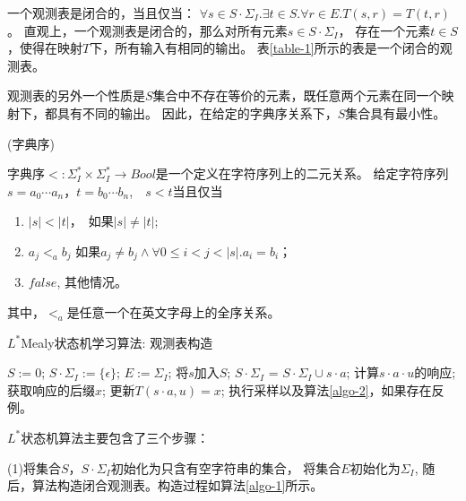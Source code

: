 一个观测表是闭合的，当且仅当：
$\forall s\in S\cdot \Sigma_{I}. \exists t\in S. \forall r\in E.
T(s, r) = T(t, r)$。
直观上，一个观测表是闭合的，那么对所有元素$s \in S\cdot \Sigma_{I}$，
存在一个元素$t\in S$，使得在映射$T$下，所有输入有相同的输出。
表\ref{table-1}所示的表是一个闭合的观测表。

观测表的另外一个性质是$S$集合中不存在等价的元素，既任意两个元素在同一个映射下，都具有不同的输出。
因此，在给定的字典序关系下，$S$集合具有最小性。

\begin{definition}{(字典序)}

	字典序$<: \Sigma_{I}^{*} \times \Sigma_{I}^{*} \rightarrow Bool$是一个定义在字符序列上的二元关系。
	给定字符序列$s = a_0\cdots a_n$，$t = b_0\cdots b_n$,　$s < t$当且仅当
	\begin{enumerate}
		\item $|s| < |t|$，　如果$|s| \neq |t|$;
		\item $a_{j} <_{a} b_{j}$
		如果$ a_{j} \neq b_{j} \wedge
		\forall 0 \leq i < j < |s|. a_{i} = b_{i}$；
		\item $false$, 其他情况。
	\end{enumerate}
	其中，$<_{a}$是任意一个在英文字母上的全序关系。
\end{definition}



\begin{algorithm}
\caption{$L^{*}$Mealy状态机学习算法: 观测表构造}
\label{algo-1}
\begin{algorithmic}
\STATE $S:=0$;
\STATE $S\cdot \Sigma_{I} := \{\epsilon\}$;
\STATE $E:=\Sigma_{I}$;
\STATE  将$s$加入$S$;
\STATE $S\cdot \Sigma_{I}$ = $S\cdot \Sigma_{I} \cup s \cdot a$;
\STATE 计算$s\cdot a\cdot u$的响应;
\STATE 获取响应的后缀$x$;
\STATE 更新$T(s\cdot a, u) = x$;
\ENDFOR
\ENDFOR
\ENDWHILE
\STATE 执行采样以及算法\ref{algo-2}，如果存在反例。
\end{algorithmic}
\end{algorithm}


$L^{*}$状态机算法主要包含了三个步骤：


	(1)将集合$S$，$S\cdot \Sigma_{I}$初始化为只含有空字符串的集合，
	将集合$E$初始化为$\Sigma_{I}$,
	随后，算法构造闭合观测表。构造过程如算法\ref{algo-1}所示。

